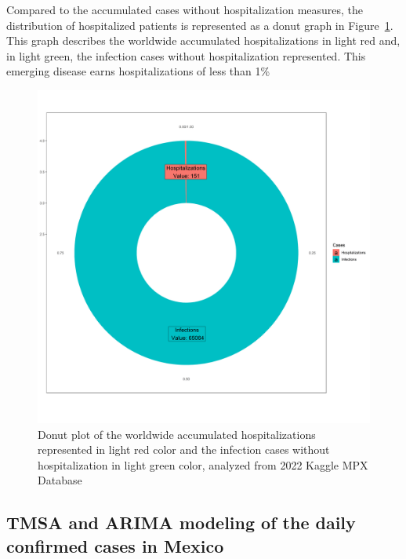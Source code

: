 \documentclass[conference]{IEEEtran}
\begin{document}
Compared to the accumulated cases without hospitalization measures, the distribution of hospitalized patients is represented as a donut graph in Figure~\ref{fig:WorldwideDonut}. This graph describes the worldwide accumulated hospitalizations in light red and, in light green, the infection cases without hospitalization represented. This emerging disease earns hospitalizations of less than 1\% %
\begin{figure}[H]
    \centering
    \includegraphics[width = 8 cm]{WorldwideDonut.png}
    \caption{Donut plot of the worldwide accumulated hospitalizations represented in light red color and the infection cases without hospitalization in light green color, analyzed from 2022 Kaggle MPX Database~\cite{Contractor2022}}
    \label{fig:WorldwideDonut}
\end{figure}

\subsection{TMSA and ARIMA modeling of the daily confirmed cases in Mexico}
\end{document}
